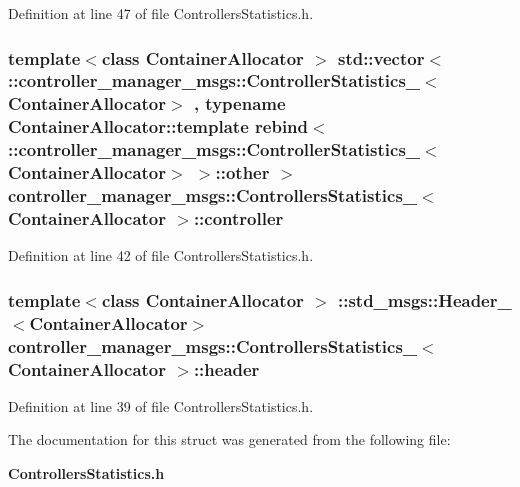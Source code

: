 \-Definition at line 47 of file \-Controllers\-Statistics.\-h.

\subsubsection[{controller}]{\setlength{\rightskip}{0pt plus 5cm}template$<$class Container\-Allocator $>$ std\-::vector$<$ \-::{\bf controller\-\_\-manager\-\_\-msgs\-::\-Controller\-Statistics\-\_\-}$<$\-Container\-Allocator$>$ , typename \-Container\-Allocator\-::template rebind$<$ \-::{\bf controller\-\_\-manager\-\_\-msgs\-::\-Controller\-Statistics\-\_\-}$<$\-Container\-Allocator$>$ $>$\-::other $>$ {\bf controller\-\_\-manager\-\_\-msgs\-::\-Controllers\-Statistics\-\_\-}$<$ \-Container\-Allocator $>$\-::{\bf controller}}\label{structcontroller__manager__msgs_1_1ControllersStatistics___af7419093366424a361920228f52e1990}


\-Definition at line 42 of file \-Controllers\-Statistics.\-h.

\subsubsection[{header}]{\setlength{\rightskip}{0pt plus 5cm}template$<$class Container\-Allocator $>$ \-::std\-\_\-msgs\-::\-Header\-\_\-$<$\-Container\-Allocator$>$ {\bf controller\-\_\-manager\-\_\-msgs\-::\-Controllers\-Statistics\-\_\-}$<$ \-Container\-Allocator $>$\-::{\bf header}}\label{structcontroller__manager__msgs_1_1ControllersStatistics___a5945f19ca50df39027a319fc84756761}


\-Definition at line 39 of file \-Controllers\-Statistics.\-h.



\-The documentation for this struct was generated from the following file\-:\begin{DoxyCompactItemize}
\item 
{\bf \-Controllers\-Statistics.\-h}\end{DoxyCompactItemize}
